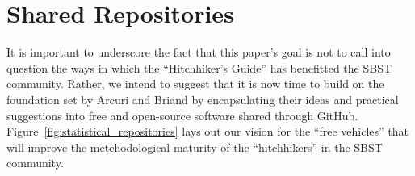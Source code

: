 
\vspace*{-.5em}

\section{Shared Repositories}
\label{sec:repositories}



It is important to underscore the fact that this paper's goal is not to call into question the ways in which the
``Hitchhiker's Guide'' has benefitted the SBST community. Rather, we intend to suggest that it is now time to build on
the foundation set by Arcuri and Briand by encapsulating their ideas and practical suggestions into free and open-source
software shared through GitHub. Figure~\ref{fig:statistical_repositories} lays out our vision for the ``free vehicles''
that will improve the metehodological maturity of the ``hitchhikers'' in the SBST community.
